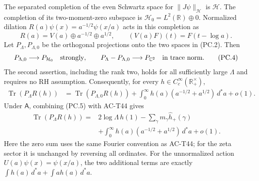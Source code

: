 \begin{theorem}
\label{AC-T45}
The separated completion of the even Schwartz space for
$\|J\psi\|_{\mathcal H}$ is $\mathcal H$.  The completion
of its two-moment-zero subspace is
$\mathcal H_0=L^2(\mathbb R)\oplus0$.
Normalized dilation
$R(a)\psi(x)=a^{-1/2}\psi(x/a)$ acts in this completion as
\[
 R(a)=V(a)\oplus a^{-1/2}\oplus a^{1/2},\qquad
       (V(a)F)(t)=F(t-\log a).
 \tag{PC.3}
\]
Let $P_\Lambda,P_{\Lambda,0}$ be the orthogonal projections
onto the two spaces in (PC.2).  Then
\[
 P_{\Lambda,0}\longrightarrow P_{\mathcal H_0}
       \quad\hbox{strongly},\qquad
 P_\Lambda-P_{\Lambda,0}\longrightarrow P_{\mathbb C^2}
       \quad\hbox{in trace norm}.
 \tag{PC.4}
\]
The second assertion, including the rank two, holds for all
sufficiently large $\Lambda$ and requires no RH assumption.
Consequently, for every $h\in C_c^\infty(\mathbb R_+^\times)$,
\[
 \begin{split}
 \operatorname{Tr}(P_\Lambda R(h))
   &=\operatorname{Tr}(P_{\Lambda,0}R(h))
       +\int_0^\infty h(a)(a^{-1/2}+a^{1/2})\,d^*a+o(1).
 \end{split}
 \tag{PC.5}
\]
Under $\mathsf A$, combining (PC.5) with AC-T44 gives
\[
 \begin{split}
 \operatorname{Tr}(P_\Lambda R(h))
  ={}&2\log\Lambda\,h(1)
     -\sum_\gamma m_\gamma\widehat h_+(\gamma)\\
    &+\int_0^\infty h(a)(a^{-1/2}+a^{1/2})\,d^*a+o(1).
 \end{split}
 \tag{PC.6}
\]
Here the zero sum uses the same Fourier convention as AC-T44;
for the zeta sector it is unchanged by reversing all ordinates.
For the unnormalized action $U(a)\psi(x)=\psi(x/a)$,
the two additional terms are exactly
$\int h(a)\,d^*a+\int a h(a)\,d^*a$.
\end{theorem}

